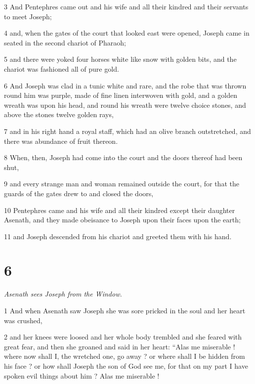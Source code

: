 \par 3 And Pentephres came out and his wife and all their kindred and their servants to meet Joseph; 

\par 4 and, when the gates of the court that looked east were opened, Joseph came in seated in the second chariot of Pharaoh; 

\par 5 and there were yoked four horses white like snow with golden bits, and the chariot was fashioned all of pure gold. 

\par 6 And Joseph was clad in a tunic white and rare, and the robe that was thrown round him was purple, made of fine linen interwoven with gold, and a golden wreath was upon his head, and round his wreath were twelve choice stones, and above the stones twelve golden rays, 

\par 7 and in his right hand a royal staff, which had an olive branch outstretched, and there was abundance of fruit thereon. 

\par 8 When, then, Joseph had come into the court and the doors thereof had been shut, 

\par 9 and every strange man and woman remained outside the court, for that the guards of the gates drew to and closed the doors, 

\par 10 Pentephres came and his wife and all their kindred except their daughter Asenath, and they made obeisance to Joseph upon their faces upon the earth; 

\par 11 and Joseph descended from his chariot and greeted them with his hand. 

\chapter{6}

\textit{Asenath sees Joseph from the Window.}

\par 1 And when Asenath saw Joseph she was sore pricked in the soul and her heart was crushed, 

\par 2 and her knees were loosed and her whole body trembled and she feared with great fear, and then she groaned and said in her heart: “Alas me miserable ! where now shall I, the wretched one, go away ? or where shall I be hidden from his face ? or how shall Joseph the son of God see me, for that on my part I have spoken evil things about him ? Alas me miserable ! 

